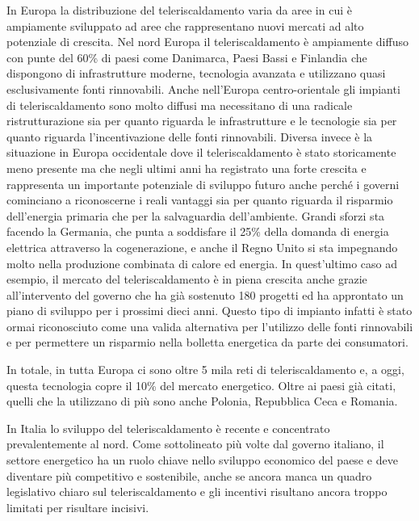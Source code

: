 \documentclass[laurea,oneside,11pt]{USiena_tesiLM3}
\begin{document}
In Europa la distribuzione del teleriscaldamento varia da aree in cui è ampiamente sviluppato ad aree che rappresentano nuovi mercati ad alto potenziale di crescita.
Nel nord Europa il teleriscaldamento è ampiamente diffuso con punte del 60\% di paesi come Danimarca, Paesi Bassi e Finlandia che dispongono di infrastrutture moderne, tecnologia avanzata e utilizzano quasi esclusivamente fonti rinnovabili. Anche nell'Europa centro-orientale gli impianti di teleriscaldamento sono molto diffusi ma necessitano di una radicale ristrutturazione sia per quanto riguarda le infrastrutture e le tecnologie sia per quanto riguarda l'incentivazione delle fonti rinnovabili. Diversa invece è la situazione in Europa occidentale dove il teleriscaldamento è stato storicamente meno presente ma che negli ultimi anni ha registrato una forte crescita e rappresenta un importante potenziale di sviluppo futuro anche perché i governi cominciano a riconoscerne i reali vantaggi sia per quanto riguarda il risparmio dell'energia primaria che per la salvaguardia dell'ambiente.
Grandi sforzi sta facendo la Germania, che punta a soddisfare il 25\% della domanda di energia elettrica attraverso la cogenerazione, e anche il Regno Unito si sta impegnando molto nella produzione combinata di calore ed energia.
In quest'ultimo caso ad esempio, il mercato del teleriscaldamento è  in piena crescita anche grazie all'intervento del governo che ha già sostenuto 180 progetti ed ha approntato un piano di sviluppo per i prossimi dieci anni. Questo tipo di impianto infatti è stato ormai riconosciuto come una valida alternativa per l'utilizzo delle fonti rinnovabili e per permettere un risparmio nella bolletta energetica da parte dei consumatori.

In totale, in tutta Europa ci sono oltre 5 mila reti di teleriscaldamento e, a oggi, questa tecnologia copre il 10\% del mercato energetico. Oltre ai paesi già citati, quelli che la utilizzano di più sono anche Polonia, Repubblica Ceca e Romania.

In Italia lo sviluppo del teleriscaldamento è recente e concentrato prevalentemente al nord. Come sottolineato più volte dal governo italiano, il settore energetico ha un ruolo chiave nello sviluppo economico del paese e deve diventare più competitivo e sostenibile, anche se ancora manca un quadro legislativo chiaro sul teleriscaldamento e gli incentivi risultano ancora troppo limitati per risultare incisivi. 
 
\end{document}
